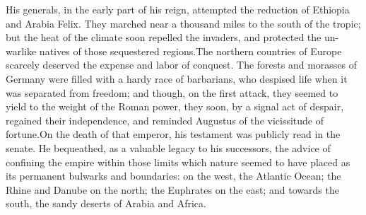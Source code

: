
His generals, in the early part of his reign, attempted the
reduction of Ethiopia and Arabia Felix. They marched near a
thousand miles to the south of the tropic; but the heat of the
climate soon repelled the invaders, and protected the un-warlike
natives of those sequestered regions.\footnotemark[2] The northern countries
of Europe scarcely deserved the expense and labor of conquest.
The forests and morasses of Germany were filled with a hardy race
of barbarians, who despised life when it was separated from
freedom; and though, on the first attack, they seemed to yield to
the weight of the Roman power, they soon, by a signal act of
despair, regained their independence, and reminded Augustus of
the vicissitude of fortune.\footnotemark[3] On the death of that emperor, his
testament was publicly read in the senate. He bequeathed, as a
valuable legacy to his successors, the advice of confining the
empire within those limits which nature seemed to have placed as
its permanent bulwarks and boundaries: on the west, the Atlantic
Ocean; the Rhine and Danube on the north; the Euphrates on the
east; and towards the south, the sandy deserts of Arabia and
Africa.\footnotemark[4]

